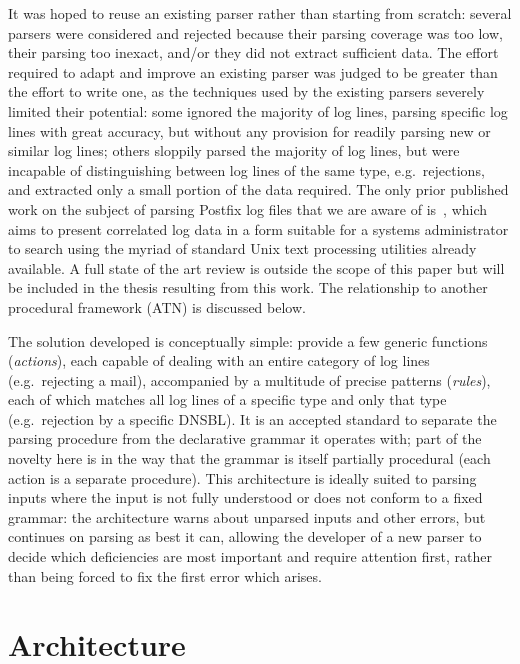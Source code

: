 \documentclass{svmult}
\begin{document}
It was hoped to reuse an existing parser rather than starting from scratch:
several parsers were considered and rejected because their parsing coverage
was too low, their parsing too inexact, and/or they did not extract
sufficient data.  The effort required to adapt and improve an existing
parser was judged to be greater than the effort to write one, as the
techniques used by the existing parsers severely limited their potential:
some ignored the majority of log lines, parsing specific log lines with
great accuracy, but without any provision for readily parsing new or
similar log lines; others sloppily parsed the majority of log lines, but
were incapable of distinguishing between log lines of the same type, e.g.\
rejections, and extracted only a small portion of the data required.  The
only prior published work on the subject of parsing Postfix log files that
we are aware of is~\cite{log-mail-analyser}, which aims to present
correlated log data in a form suitable for a systems administrator to
search using the myriad of standard Unix text processing utilities already
available.  A full state of the art review is outside the scope of this
paper but will be included in the thesis resulting from this work.
The relationship to another procedural framework (ATN) is discussed below.

The solution developed is conceptually simple: provide a few generic
functions (\textit{actions\/}), each capable of dealing with an entire
category of log lines (e.g.\ rejecting a mail), accompanied by a multitude
of precise patterns (\textit{rules\/}), each of which matches all log lines
of a specific type and only that type (e.g.\ rejection by a specific
DNSBL).  It is an accepted standard to separate the parsing procedure from
the declarative grammar it operates with; part of the novelty here is in
the way that the grammar is itself partially procedural (each action is a
separate procedure).  This architecture is ideally suited to parsing inputs
where the input is not fully understood or does not conform to a fixed
grammar: the architecture warns about unparsed inputs and other errors, but
continues on parsing as best it can, allowing the developer of a new parser
to decide which deficiencies are most important and require attention
first, rather than being forced to fix the first error which arises.

\section{Architecture}
\end{document}
